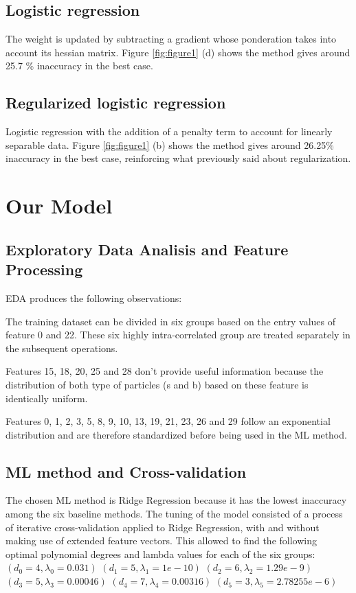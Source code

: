 \documentclass[10pt,conference,compsocconf]{IEEEtran}
\begin{document}
\subsection{Logistic regression}
The weight is updated by subtracting a gradient whose ponderation takes into account its hessian matrix. Figure \ref{fig:figure1} (d) shows the method gives around 25.7 \% inaccuracy in the best case.
\subsection{Regularized logistic regression}
Logistic regression with the addition of a penalty term to account for linearly separable data. Figure \ref{fig:figure1} (b) shows the method gives around 26.25\% inaccuracy in the best case, reinforcing what previously said about regularization.
\section{Our Model}
\subsection{Exploratory Data Analisis and Feature Processing}
EDA produces the following observations:

The training dataset can be divided in six groups based on the entry values of feature 0 and 22. These six highly intra-correlated group are treated separately in the subsequent operations.

Features 15, 18, 20, 25 and 28 don't provide useful information because the distribution of both type of particles (s and b) based on these feature is  identically uniform.

Features 0, 1, 2, 3, 5, 8, 9, 10, 13, 19, 21, 23, 26 and 29 follow an exponential distribution and are therefore standardized before being used in the ML method.
\subsection{ML method and Cross-validation}
The chosen ML method is Ridge Regression because it has the lowest inaccuracy among the six baseline methods.
The tuning of the model consisted of a process of iterative cross-validation applied to Ridge Regression, with and without making use of extended feature vectors.
This allowed to find the following optimal polynomial degrees and lambda values for each of the six groups:
$(d_0 = 4, \lambda_0 = 0.031)$
$(d_1 = 5, \lambda_1 = 1e-10)$
$(d_2 = 6, \lambda_2 = 1.29e-9)$
$(d_3 = 5, \lambda_3 = 0.00046)$
$(d_4 = 7, \lambda_4 = 0.00316)$
$(d_5 = 3, \lambda_5 = 2.78255e-6)$
\end{document}
